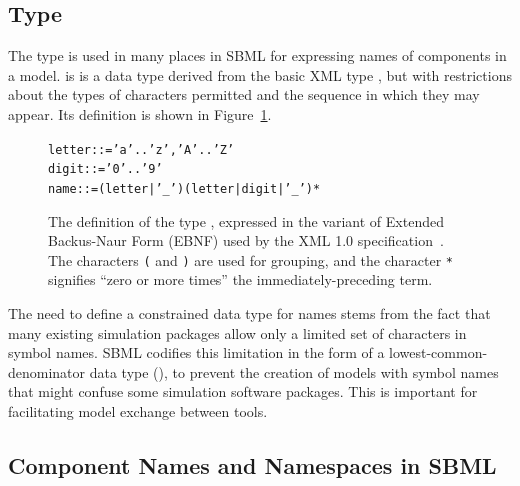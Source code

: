 \documentclass[10pt]{cekarticle}
\newcommand{\vref}[1]{\ref{#1}}
\newcommand{\changed}[1]{\textcolor{BrickRed}{#1}}
\begin{document}
\subsection{Type }
\label{sec:name}

The type  is used in many places in SBML for expressing names
of components in a model.   is is a data type derived from the
basic XML type , but with restrictions about the types of
characters permitted and the sequence in which they may appear.  Its 
definition is shown in Figure~\vref{fig:name}.

\begin{figure}[t]
  \vspace*{10pt}
  \centering
  \begin{minipage}{4.2in}
\begin{alltt}
  letter   ::= 'a'..'z','A'..'Z'
  digit    ::= '0'..'9'
  \changed{name     ::= ( letter | '_' ) ( letter | digit | '_' )*}
\end{alltt}
  \end{minipage}
\caption{\changed{The definition of the type , expressed in the
    variant of Extended Backus-Naur Form (EBNF) used by the XML 1.0
    specification~\protect\citep{bray:2000}.  The characters \texttt{(} and
    \texttt{)} are used for grouping, and the character \texttt{*}
    signifies ``zero or more times'' the immediately-preceding term.}}
  \label{fig:name}
\end{figure}    

The need to define a constrained data type for names stems from the fact
that many existing simulation packages allow only a limited set of
characters in symbol names.  SBML codifies this limitation in the form of a
lowest-common-denominator data type (), to prevent the
creation of models with symbol names that might confuse some simulation
software packages.  This is important for facilitating model exchange
between tools.


\subsection{Component Names and Namespaces in SBML}
\label{sec:namespaces}
\end{document}
